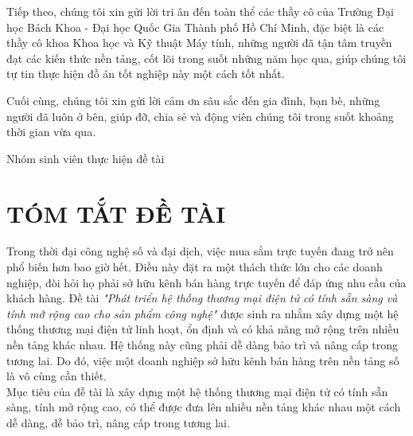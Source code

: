 \noindent Tiếp theo, chúng tôi xin gửi lời tri ân đến toàn thể các thầy cô của Trường Đại học Bách Khoa - Đại học Quốc Gia Thành phố Hồ Chí Minh, đặc biệt là các thầy cô khoa Khoa học và Kỹ thuật Máy tính, những người đã tận tâm truyền đạt các kiến thức nền tảng, cốt lõi trong suốt những năm học qua, giúp chúng tôi tự tin thực hiện đồ án tốt nghiệp này một cách tốt nhất.\vspace{0.5cm}

\noindent Cuối cùng, chúng tôi xin gửi lời cảm ơn sâu sắc đến gia đình, bạn bè, những người đã luôn ở bên, giúp đỡ, chia sẻ và động viên chúng tôi trong suốt khoảng thời gian vừa qua.\vspace{0.5cm}

\begin{flushright}
Nhóm sinh viên thực hiện đề tài
\end{flushright}

\newpage
\section*{\Huge TÓM TẮT ĐỀ TÀI}
\noindent Trong thời đại công nghệ số và đại dịch, việc mua sắm trực tuyến đang trở nên phổ biến hơn bao giờ hết. Điều này đặt ra một thách thức lớn cho các doanh nghiệp, đòi hỏi họ phải sở hữu kênh bán hàng trực tuyến để đáp ứng nhu cầu của khách hàng. Đề tài \textit{"Phát triển hệ thống thương mại điện tử có tính sẵn sàng và tính mở rộng cao cho sản phẩm công nghệ"} được sinh ra nhằm xây dựng một hệ thống thương mại điện tử linh hoạt, ổn định và có khả năng mở rộng trên nhiều nền tảng khác nhau. Hệ thống này cũng phải dễ dàng bảo trì và nâng cấp trong tương lai. Do đó, việc một doanh nghiệp sở hữu kênh bán hàng trên nền tảng số là vô cùng cần thiết. \\[0.5cm]
Mục tiêu của đề tài là xây dựng một hệ thống thương mại điện tử có tính sẵn sàng, tính mở rộng cao, có thể được đưa lên nhiều nền tảng khác nhau một cách dễ dàng, dễ bảo trì, nâng cấp trong tương lai.